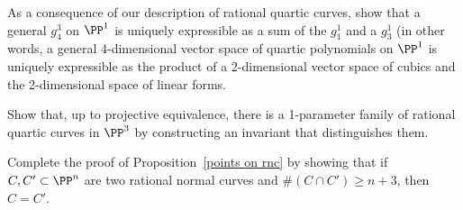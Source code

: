 \begin{exercise}
As a consequence of our description of rational quartic curves, show that a general $g^3_4$ on $\PP^1$ is uniquely expressible as a sum of the $g_1^1$ and a $g^1_3$
(in other words, a general 4-dimensional vector space of quartic polynomials on $\PP^1$ is uniquely expressible as the product of a 2-dimensional vector space of cubics and the 2-dimensional space of linear forms.
\end{exercise}

\begin{exercise}
Show that, up to projective equivalence, there is a 1-parameter family of rational quartic curves in $\PP^3$ 
by constructing an invariant that distinguishes them. 
\end{exercise}






\begin{exercise}\label{Castelnuovo uniqueness}
Complete the proof of Proposition~\ref{points on rnc} by showing that if $C, C' \subset \PP^n$ are two rational normal curves and $\#(C \cap C') \geq n+3$, then $C = C'$. 
\end{exercise}


